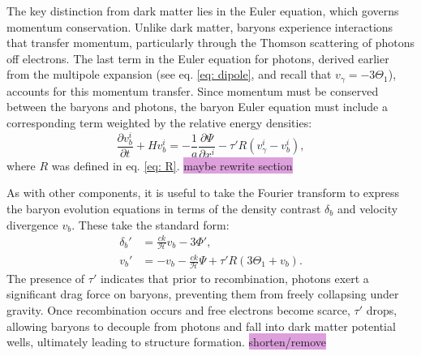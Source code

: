 \documentclass{aa}
\numberwithin{equation}{section}
\numberwithin{table}{section}
\numberwithin{figure}{section}
\begin{document}
The key distinction from dark matter lies in the Euler equation, which governs momentum conservation. Unlike dark matter, baryons experience interactions that transfer momentum, particularly through the Thomson scattering of photons off electrons. 
The last term in the Euler equation for photons, derived earlier from the multipole expansion (see eq. \eqref{eq: dipole}, and recall that $v_\gamma=-3\Theta_1$), accounts for this momentum transfer.
Since momentum must be conserved between the baryons and photons, the baryon Euler equation must include a corresponding term weighted by the relative energy densities:
\begin{equation}
    \frac{\partial v_b^i}{\partial t} + H v_b^i = -\frac{1}{a} \frac{\partial \Psi}{\partial x^i} - \tau' R(v_\gamma^i - v_b^i),
\end{equation}
where $R$ was defined in eq. \eqref{eq: R}. \colorbox{Plum}{maybe rewrite section}

As with other components, it is useful to take the Fourier transform to express the baryon evolution equations in terms of the density contrast $\delta_b$ and velocity divergence $v_b$. These take the standard form:
\begin{align}
    \delta_b' &= \frac{c k}{\mathcal{H}} v_b - 3\Phi', \\
    v_b' &= - v_b - \frac{c k}{\mathcal{H}} \Psi + \tau' R (3\Theta_1 + v_b).
\end{align}
The presence of $\tau'$ indicates that prior to recombination, photons exert a significant drag force on baryons, preventing them from freely collapsing under gravity. Once recombination occurs and free electrons become scarce, $\tau'$ drops, allowing baryons to decouple from photons and fall into dark matter potential wells, ultimately leading to structure formation. \colorbox{Plum}{shorten/remove}
\end{document}
